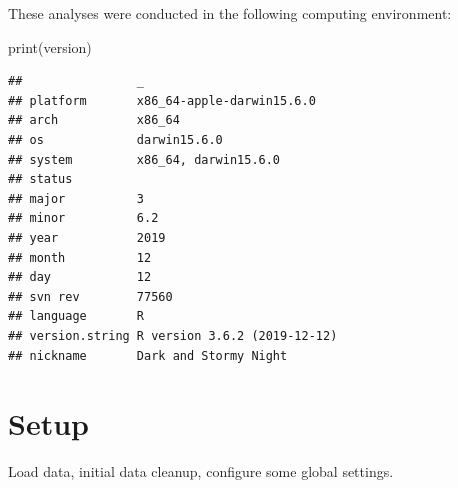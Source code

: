 \documentclass[
]{book}
\newenvironment{Shaded}{\begin{snugshade}}{\end{snugshade}}
\newcommand{\FunctionTok}[1]{\textcolor[rgb]{0.00,0.00,0.00}{#1}}
\newcommand{\NormalTok}[1]{#1}
\begin{document}
These analyses were conducted in the following computing environment:

\begin{Shaded}
\begin{Highlighting}[]
\FunctionTok{print}\NormalTok{(version)}
\end{Highlighting}
\end{Shaded}

\begin{verbatim}
##                _                           
## platform       x86_64-apple-darwin15.6.0   
## arch           x86_64                      
## os             darwin15.6.0                
## system         x86_64, darwin15.6.0        
## status                                     
## major          3                           
## minor          6.2                         
## year           2019                        
## month          12                          
## day            12                          
## svn rev        77560                       
## language       R                           
## version.string R version 3.6.2 (2019-12-12)
## nickname       Dark and Stormy Night
\end{verbatim}

\hypertarget{setup-1}{%
\section{Setup}\label{setup-1}}

Load data, initial data cleanup, configure some global settings.
\end{document}
